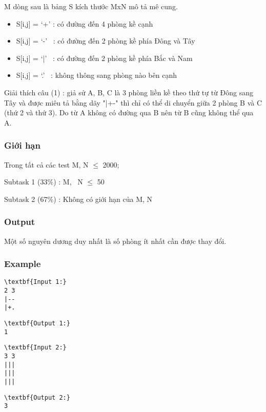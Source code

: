 M dòng sau là bảng S kích thước MxN mô tả mê cung.
\begin{itemize}
	\item S[i,j] = ‘+’ : có đường đến 4 phòng kề cạnh
	\item S[i,j] = ‘-’  : có đường đến 2 phòng kề phía Đông và Tây
	\item S[i,j] = ‘|’  : có đường đến 2 phòng kề phía Bắc và Nam
	\item S[i,j] = ‘.’  : không thông sang phòng nào bên cạnh
\end{itemize}

Giải thích câu (1) : giả sử A, B, C là 3 phòng liền kề theo thứ tự từ Đông sang Tây và được miêu tả bằng dãy "|+-" thì chỉ có thể di chuyển giữa 2 phòng B và C (thứ 2 và thứ 3). Do từ A không có đường qua B nên từ B cũng không thể qua A.

\subsubsection{Giới hạn}

Trong tất cả các test M, N  $\le$  2000;

Subtask 1 (33\%) : M,  N  $\le$  50

Subtask 2 (67\%) : Không có giới hạn của M, N

\subsubsection{Output}

Một số nguyên dương duy nhất là số phòng ít nhất cần được thay đổi.

\subsubsection{Example}
\begin{verbatim}
\textbf{Input 1:}
2 3
|--
|+.\end{verbatim}
\begin{verbatim}
\textbf{Output 1:}
1\end{verbatim}
\begin{verbatim}
\textbf{Input 2:}
3 3
|||
|||
|||\end{verbatim}
\begin{verbatim}
\textbf{Output 2:}
3\end{verbatim}
